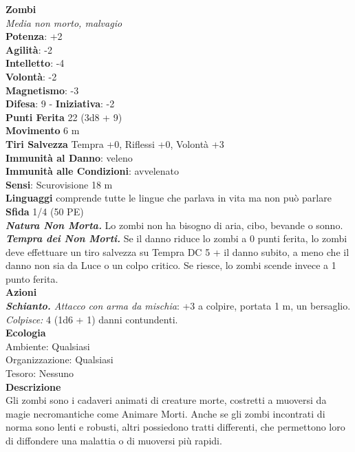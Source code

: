 \begin{multicols}{2}
\medskip\textbf{Zombi}\\
\emph{Media non morto, malvagio}\\
\textbf{Potenza}: +2\\
\textbf{Agilità}: -2\\
\textbf{Intelletto}: -4\\
\textbf{Volontà}: -2\\
\textbf{Magnetismo}: -3\\
\textbf{Difesa}: 9 - \textbf{Iniziativa}: -2\\
\textbf{Punti Ferita} 22 (3d8 + 9)\\
\textbf{Movimento} 6 m\\
\textbf{Tiri Salvezza}  Tempra +0, Riflessi +0, Volontà +3\\
\textbf{Immunità al Danno}: veleno\\
\textbf{Immunità alle Condizioni}: avvelenato\\
\textbf{Sensi}: Scurovisione 18 m\\
\textbf{Linguaggi} comprende tutte le lingue che parlava in vita ma non può parlare\\
\textbf{Sfida} 1/4 (50 PE)\smallskip\\
\emph{\textbf{Natura Non Morta.}} Lo zombi non ha bisogno di aria, cibo, bevande o sonno.\\
\emph{\textbf{Tempra dei Non Morti.}} Se il danno riduce lo zombi a 0 punti ferita, lo zombi deve effettuare un tiro salvezza su Tempra DC 5 + il danno subito, a meno che il danno non sia da Luce o un colpo critico. Se riesce, lo zombi scende invece a 1 punto ferita.\\
\smallskip\textbf{Azioni}\\
\emph{\textbf{Schianto.} Attacco con arma da mischia}: +3 a colpire, portata 1 m, un bersaglio.\\
\emph{Colpisce:} 4 (1d6 + 1) danni contundenti.\\
\textbf{Ecologia}\\
Ambiente: Qualsiasi\\
Organizzazione: Qualsiasi\\
Tesoro: Nessuno\\
\textbf{Descrizione}\\
Gli zombi sono i cadaveri animati di creature morte, costretti a muoversi da magie necromantiche come Animare Morti. Anche se gli zombi incontrati di norma sono lenti e robusti, altri possiedono tratti differenti, che permettono loro di diffondere una malattia o di muoversi più rapidi.\\


\end{multicols}

